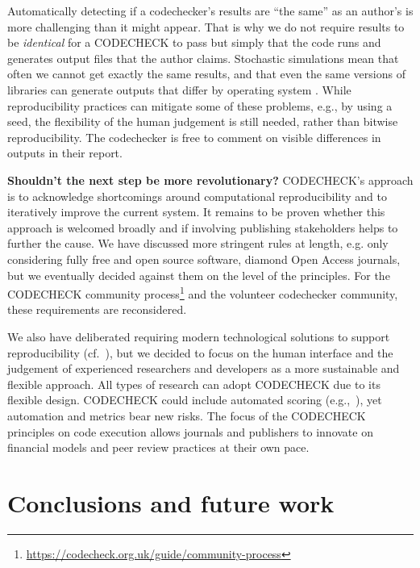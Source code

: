 \documentclass[12pt]{article}
\begin{document}
Automatically detecting if a codechecker's results are ``the same'' as
an author's is more challenging than it might appear.  That is why we
do not require results to be \textit{identical} for a CODECHECK to pass
but simply that the code runs and generates output files that the
author claims. Stochastic simulations mean that often we cannot get
exactly the same results, and that even the same versions of libraries
can generate outputs that differ by operating system
\cite{Gronenschild2012-pp}.  While reproducibility practices can
mitigate some of these problems, e.g., by using a seed, the
flexibility of the human judgement is still needed, rather than
bitwise reproducibility.  The codechecker is free to comment on
visible differences in outputs in their report.

\textbf{Shouldn't the next step be more revolutionary?}  CODECHECK's
approach is to acknowledge shortcomings around computational
reproducibility and to iteratively improve the current system.  It
remains to be proven whether this approach is welcomed broadly and if
involving publishing stakeholders helps to further the cause.  We have
discussed more stringent rules at length, e.g. only considering fully
free and open source software, diamond Open Access journals, but we
eventually decided against them on the level of the principles.  For
the CODECHECK community
process\footnote{\url{https://codecheck.org.uk/guide/community-process}}
and the volunteer codechecker community, these requirements are
reconsidered.

We also have deliberated requiring modern technological solutions to
support reproducibility (cf.~\cite{konkol_publishing_2020}), but we
decided to focus on the human interface and the judgement of
experienced researchers and developers as a more sustainable and
flexible approach.  All types of research can adopt CODECHECK due to
its flexible design.  CODECHECK could include automated scoring
(e.g.,~\cite{menke_rigor_2020}), yet automation and metrics bear new
risks.  The focus of the CODECHECK principles on code execution allows
journals and publishers to innovate on financial  models and peer
review practices at their own pace.

\section*{Conclusions and future work}\label{future-work-and-conclusions}
\end{document}
